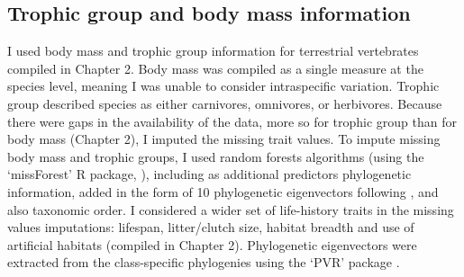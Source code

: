 \subsection{Trophic group and body mass information}

I used body mass and trophic group information for terrestrial vertebrates compiled in Chapter 2. Body mass was compiled as a single measure at the species level, meaning I was unable to consider intraspecific variation. Trophic group described species as either carnivores, omnivores, or herbivores. Because there were gaps in the availability of the data, more so for trophic group than for body mass (Chapter 2), I imputed the missing trait values. To impute missing body mass and trophic groups, I used random forests algorithms (using the `missForest' R package, \citep{Stekhoven2012, Stekhoven2016}), including as additional predictors phylogenetic information, added in the form of 10 phylogenetic eigenvectors \citep{DinizFilho2012} following \citet{Penone2014}, and also taxonomic order. I considered a wider set of life-history traits in the missing values imputations: lifespan, litter/clutch size, habitat breadth and use of artificial habitats (compiled in Chapter 2). Phylogenetic eigenvectors were extracted from the class-specific phylogenies using the `PVR' package \citep{Santos2018}.  


